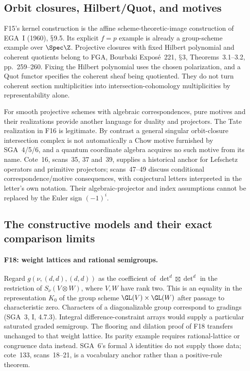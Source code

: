 \documentclass[11pt,a4paper]{article}
\renewcommand{\S}{\ensuremath{\mathsection}}
\newcommand{\fid}[1]{\textsf{#1}}\newcommand{\gate}[1]{\textsf{#1}}
\theoremstyle{named}\newtheorem{finding}{Finding}[section]
\theoremstyle{definition}\newtheorem{definition}[finding]{Definition}
\theoremstyle{remark}\newtheorem{remark}[finding]{Remark}
\begin{document}
\subsection{Orbit closures, Hilbert/Quot, and motives}
\fid{F15}'s kernel construction is the affine scheme-theoretic-image construction of EGA~I (1960), \S9.5. Its explicit $f=p$ example is already a group-scheme example over $\Spec\Z$. Projective closures with fixed Hilbert polynomial and coherent quotients belong to FGA, Bourbaki Expos\'e~221, \S3, Theorems~3.1--3.2, pp.~259--260. Fixing the Hilbert polynomial uses the chosen polarization, and a Quot functor specifies the coherent sheaf being quotiented. They do not turn coherent section multiplicities into intersection-cohomology multiplicities by representability alone.

For smooth projective schemes with algebraic correspondences, pure motives and their realizations provide another language for duality and projectors. The Tate realization in \fid{F16} is legitimate. By contrast a general singular orbit-closure intersection complex is not automatically a Chow motive furnished by SGA~4/5/6, and a quantum coordinate algebra acquires no such motive from its name. Cote~16, scans~35, 37 and~39, supplies a historical anchor for Lefschetz operators and primitive projectors; scans~47--49 discuss conditional correspondence/motive consequences, with conjectural letters interpreted in the letter's own notation. Their algebraic-projector and index assumptions cannot be replaced by the Euler sign $(-1)^i$.

\subsection{The constructive models and their exact comparison limits}
\paragraph{\fid{F18}: weight lattices and rational semigroups.}
Regard $g(\nu,(d,d),(d,d))$ as the coefficient of
$\det^d\boxtimes\det^d$ in the restriction of $S_\nu(V\otimes W)$,
where $V,W$ have rank two. This is an equality in the representation
$K_0$ of the group scheme $\GL(V)\times\GL(W)$ after passage to
characteristic zero. Characters of a diagonalizable group correspond
to gradings (SGA~3, I, 4.7.3). Integral difference-constraint arrays
would supply a particular saturated graded semigroup. The flooring
and dilation proof of \fid{F18} transfers unchanged to that weight
lattice. Its parity example requires rational-lattice or congruence
data instead. SGA~6's formal $\lambda$ identities do not supply those
data; cote~133, scans~18--21, is a vocabulary anchor rather than a
positive-rule theorem.
\end{document}
